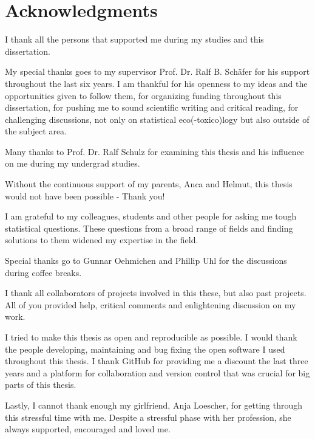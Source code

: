 
\begingroup
\let\clearpage\relax
\let\cleardoublepage\relax
\let\cleardoublepage\relax

\chapter*{Acknowledgments}

I thank all the persons that supported me during my studies and this dissertation.

\noindent My special thanks goes to my supervisor Prof. Dr. Ralf B. Schäfer for his support throughout the last six years. 
I am thankful for his openness to my ideas and the opportunities given to follow them, 
for organizing funding throughout this dissertation, 
for pushing me to sound scientific writing and critical reading, 
for challenging discussions, not only on statistical eco(-toxico)logy but also outside of the subject area.

\noindent Many thanks to Prof. Dr. Ralf Schulz for examining this thesis and his influence on me during my undergrad studies.

\noindent Without the continuous support of my parents, Anca and Helmut, this thesis would not have been possible - Thank you!

\noindent I am grateful to my colleagues, students and other people for asking me tough statistical questions. 
These questions from a broad range of fields and finding solutions to them widened my expertise in the field.

\noindent Special thanks go to Gunnar Oehmichen and Phillip Uhl for the discussions during coffee breaks.

\noindent I thank all collaborators of projects involved in this these, but also past projects. All of you provided help, critical comments and enlightening discussion on my work.

\noindent I tried to make this thesis as open and reproducible as possible. I would thank the people developing, maintaining and bug fixing the open software I used throughout this thesis. I thank GitHub for providing me a discount the last three years and a platform for collaboration and version control that was crucial for big parts of this thesis. 

\noindent Lastly, I cannot thank enough my girlfriend, Anja Loescher, for getting through this stressful time with me.
Despite a stressful phase with her profession, she always supported, encouraged and loved me. 


\endgroup 

